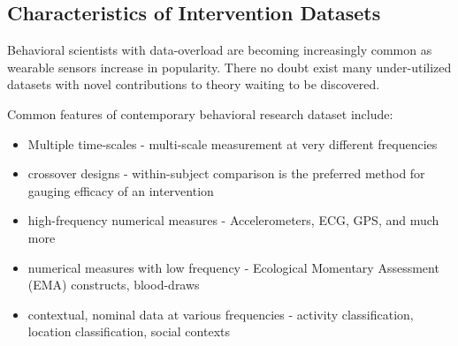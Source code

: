 
\subsection{Characteristics of Intervention Datasets}

Behavioral scientists with data-overload are becoming increasingly common as wearable sensors increase in popularity.
There no doubt exist many under-utilized datasets with novel contributions to theory waiting to be discovered.

Common features of contemporary behavioral research dataset include:

\begin{itemize}
	\item{Multiple time-scales - multi-scale measurement at very different frequencies}
	\item{crossover designs - within-subject comparison is the preferred method for gauging efficacy of an intervention}
	\item{high-frequency numerical measures - Accelerometers, ECG, GPS, and much more}
	\item{numerical measures with low frequency - Ecological Momentary Assessment (EMA) constructs, blood-draws}
	\item{contextual, nominal data at various frequencies - activity classification, location classification, social contexts}
\end{itemize}


